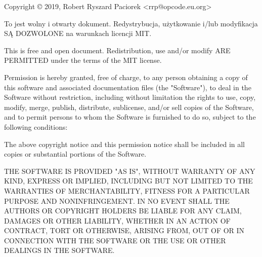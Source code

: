 \documentclass[aspectratio=169]{beamer} %
\begin{document}
\begin{frame}
Copyright © 2019, Robert Ryszard Paciorek <rrp@opcode.eu.org>

\footnotesize\vspace{1.5em}
To jest wolny i otwarty dokument. Redystrybucja, użytkowanie i/lub modyfikacja SĄ DOZWOLONE na warunkach licencji MIT.

\vspace{1.5em}
This is free and open document. Redistribution, use and/or modify ARE PERMITTED under the terms of the MIT license.

\tiny\vspace{2em}
Permission is hereby granted, free of charge, to any person obtaining a copy
of this software and associated documentation files (the "Software"), to deal
in the Software without restriction, including without limitation the rights
to use, copy, modify, merge, publish, distribute, sublicense, and/or sell
copies of the Software, and to permit persons to whom the Software is
furnished to do so, subject to the following conditions:

\vspace{1em}
The above copyright notice and this permission notice shall be included in all
copies or substantial portions of the Software.

\vspace{1em}
THE SOFTWARE IS PROVIDED "AS IS", WITHOUT WARRANTY OF ANY KIND, EXPRESS OR
IMPLIED, INCLUDING BUT NOT LIMITED TO THE WARRANTIES OF MERCHANTABILITY,
FITNESS FOR A PARTICULAR PURPOSE AND NONINFRINGEMENT. IN NO EVENT SHALL THE
AUTHORS OR COPYRIGHT HOLDERS BE LIABLE FOR ANY CLAIM, DAMAGES OR OTHER
LIABILITY, WHETHER IN AN ACTION OF CONTRACT, TORT OR OTHERWISE, ARISING FROM,
OUT OF OR IN CONNECTION WITH THE SOFTWARE OR THE USE OR OTHER DEALINGS IN THE
SOFTWARE.

\end{frame}
\end{document}
